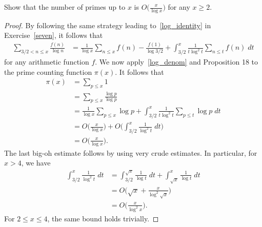 \documentclass[11pt]{article}
\newenvironment{ex}[1]
  {\renewcommand\theinnercustomthm{#1}\innercustomthm}
  {\endinnercustomthm}
\begin{document}

\begin{ex}{20}\label{twenty}
Show that the number of primes up to $x$ is $O\big(\frac{x}{\log{x}}\big)$ for any $x\geq 2$.
\end{ex}

\begin{proof}
By following the same strategy leading to~\eqref{log_identity} in Exercise~\ref{seven}, it follows that
\begin{align}
\sum_{3/2< n\leq x} \frac{f(n)}{\log{n}} &= \frac{1}{\log{x}}\sum_{n\leq x}f(n)-\frac{f(1)}{\log{3/2}}+\int_{3/2}^x\frac{1}{t\log^2{t}}\sum_{n\leq t} f(n)\;dt\label{log_denom}
\end{align}
for any arithmetic function $f$. We now apply~\eqref{log_denom} and Proposition 18 to the prime counting function $\pi(x)$. It follows that
\begin{align*}
\pi(x) &= \sum_{p\leq x} 1\\
&= \sum_{p\leq x} \frac{\log{p}}{\log{p}}\\
&= \frac{1}{\log{x}}\sum_{p\leq x}\log{p}+\int_{3/2}^x\frac{1}{t\log^2{t}}\sum_{p\leq t} \log{p}\;dt\\
&= O\bigg(\frac{x}{\log{x}}\bigg)+O\bigg(\int_{3/2}^x\frac{1}{\log^2{t}}\;dt\bigg)\\
&= O\bigg(\frac{x}{\log{x}}\bigg).
\end{align*}
The last big-oh estimate follows by using very crude estimates. In particular, for $x>4$, we have
\begin{align*}
\int_{3/2}^x\frac{1}{\log^2{t}}\;dt &= \int_{3/2}^{\sqrt{x}}\frac{1}{\log{t}}\;dt+\int_{\sqrt{x}}^x\frac{1}{\log{t}}\;dt\\
&= O\bigg(\sqrt{x}+\frac{x}{\log^2{\sqrt{x}}}\bigg)\\
&= O\bigg(\frac{x}{\log^2{x}}\bigg).
\end{align*}
For $2\leq x\leq 4$, the same bound holds trivially.
\end{proof}

\end{document}

